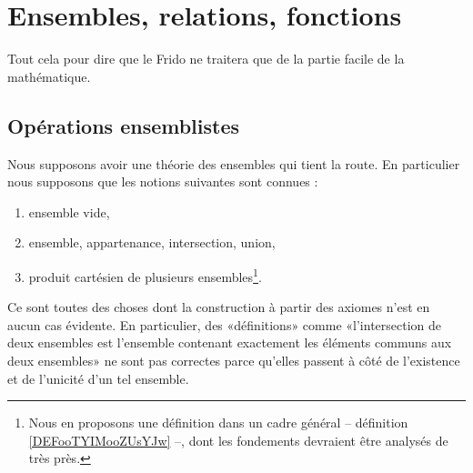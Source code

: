\section{Ensembles, relations, fonctions}
\label{SECooEltsEnsembles}

\begin{normaltext}	\label{NORMooFridoMathsFaciles}
	Tout cela pour dire que le Frido ne traitera que de la partie facile de la mathématique.
\end{normaltext}

\subsection{Opérations ensemblistes}
\label{SUBooOperationsEnsemblistes}

\begin{normaltext}\label{NorooFridoIntro2}
	Nous supposons avoir une théorie des ensembles qui tient la route. En particulier nous supposons que les notions suivantes sont connues :
	\begin{enumerate}
		\item
		      ensemble vide,
		\item
		      ensemble, appartenance, intersection, union,
		\item
		      produit cartésien de plusieurs ensembles\footnote{Nous en proposons une définition dans un cadre général -- définition \ref{DEFooTYIMooZUsYJw} --, dont les fondements devraient être analysés de très près.}.
	\end{enumerate}
	Ce sont toutes des choses dont la construction à partir des axiomes n'est en aucun cas évidente. En particulier, des «définitions» comme «l'intersection de deux ensembles est l'ensemble contenant exactement les éléments communs aux deux ensembles» ne sont pas correctes parce qu'elles passent à côté de l'existence et de l'unicité d'un tel ensemble.
\end{normaltext}

